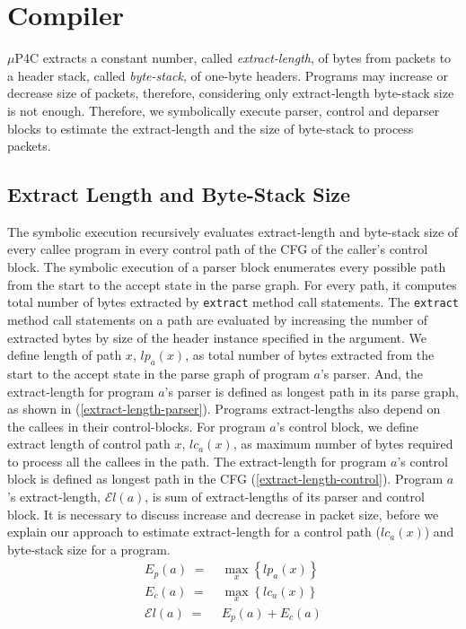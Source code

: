 \section{Compiler}
$\mu$P4C extracts a constant number, called \emph{extract-length}, of bytes from packets to a header stack, called \emph{byte-stack}, of one-byte headers.
Programs may increase or decrease size of packets, therefore, considering only extract-length byte-stack size is not enough.
Therefore, we symbolically execute parser, control and deparser blocks to estimate the extract-length and the size of byte-stack to process packets.


\subsection{Extract Length and Byte-Stack Size}
\label{subsection:wxtract-length and Byte-Stack Size}
The symbolic execution recursively evaluates extract-length and byte-stack size of every callee program in every control path of the CFG of the caller's control block.
The symbolic execution of a parser block enumerates every possible path from the start to the accept state in the parse graph.
For every path, it computes total number of bytes extracted by \texttt{extract} method call statements.
The \texttt{extract} method call statements on a path are evaluated by increasing the number of extracted bytes by size of the header instance specified in the argument.
We define length of path $x$, $lp_{a}(x)$,  as total number of bytes extracted from the start to the accept state in the parse graph of program $a$'s parser.
And, the extract-length for program $a$'s parser is defined as longest path in its parse graph, as shown in (\ref{extract-length-parser}).
Programs extract-lengths also depend on the callees in their control-blocks.
For program $a$'s control block, we define extract length of control path $x$, $lc_{a}(x)$,  as maximum number of bytes required to process all the callees in the path.
The extract-length for program $a$'s control block is defined as longest path in the CFG (\ref{extract-length-control}).
Program $a$'s extract-length, $\mathcal{E}l(a)$, is sum of extract-lengths of its parser and control block.
It is necessary to discuss increase and decrease in packet size, before we explain our approach to estimate extract-length for a control path ($lc_{a}(x)$) and byte-stack size for a program.
\begin{align}
E_{p}(a)\; =& \; \max_{x}\left\{lp_{a}(x)\right\} \label{extract-length-parser} \\
E_{c}(a)\; =& \; \max_{x}\left\{lc_{a}(x)\right\} \label{extract-length-control} \\
\mathcal{E}l(a)\; =& \; E_{p}(a) + E_{c}(a) \label{extract-length-program}
\end{align}



